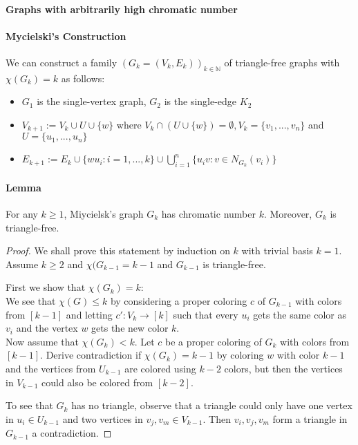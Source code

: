 \paragraph{Graphs with arbitrarily high chromatic number}
\paragraph{Mycielski's Construction} We can construct a family 
$(G_k = (V_k,E_k))_{k\in\mathbb{N}}$ of triangle-free graphs with 
$\chi(G_k) = k$ as follows:
\begin{itemize}
    \item $G_1$ is the single-vertex graph, $G_2$ is the single-edge $K_2$

    \item $V_{k+1} := V_k \cup U \cup \{w\}$ where 
    $V_k \cap (U \cup \{w\}) = \emptyset, V_k = \{v_1,...,v_n\}$ and 
    $U = \{u_1,...,u_n\}$

    \item $E_{k+1} := E_k \cup \{wu_i : i=1,...,k\} \cup 
    \bigcup^n_{i=1} \{u_iv: v \in N_{G_k}(v_i)\}$
\end{itemize}

\paragraph{Lemma} For any $k \geq 1$, Miycielsk's graph $G_k$ has chromatic 
number $k$. Moreover, $G_k$ is triangle-free.
\begin{proof}
    We shall prove this statement by induction on $k$ with trivial basis $k=1$.
    Assume $k \geq 2$ and $\chi(G_{k-1} = k-1$ and $G_{k-1}$ is triangle-free.

    \bigskip
    First we show that $\chi(G_k) = k$: \\
    We see that $\chi(G) \leq k$ by considering a proper coloring $c$ of 
    $G_{k-1}$ with colors from $[k-1]$ and letting $c': V_k \to [k]$ such
    that every $u_i$ gets the same color as $v_i$ and the vertex $w$ gets 
    the new color $k$.\\
    Now assume that $\chi(G_k) < k$. Let $c$ be a proper coloring of $G_k$ with
    colors from $[k-1]$. Derive contradiction if $\chi(G_k) = k-1$ by coloring
    $w$ with color $k-1$ and the vertices from $U_{k-1}$ are colored using 
    $k-2$ colors, but then the vertices in $V_{k-1}$ could also be colored
    from $[k-2]$.

    \bigskip
    To see that $G_k$ has no triangle, observe that a triangle could only have 
    one vertex in $u_i \in U_{k-1}$ and two vertices in $v_j,v_m \in V_{k-1}$.
    Then $v_i,v_j,v_m$ form a triangle in $G_{k-1}$ a contradiction.
\end{proof}

